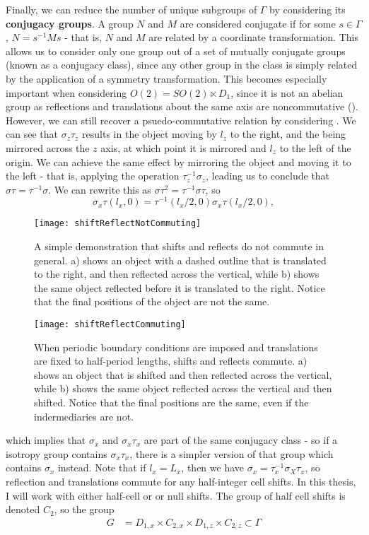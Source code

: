 Finally, we can reduce the number of unique subgroups of $\Gamma$ by considering its {\bf conjugacy groups}. A group $N$ and $M$ are considered conjugate if for some $s \in \Gamma$, $N = s^{-1}Ms$ - that is, $N$ and $M$ are related by a coordinate transformation. This allows us to consider only one group out of a set of mutually conjugate groups (known as a conjugacy class), since any other group in the class is simply related by the application of a symmetry transformation. This becomes especially important when considering $O(2) =  SO(2) \ltimes D_{1}$, since it is not an abelian group as reflections and translations about the same axis are noncommutative (). However, we can still recover a psuedo-commutative relation by considering . We can see that $\sigma_z\tau_z$ results in the object moving by $l_z$ to the right, and the being mirrored across the $z$ axis, at which point it is mirrored and $l_z$ to the left of the origin. We can achieve the same effect by mirroring the object and moving it to the left - that is, applying the operation $\tau_z^{-1}\sigma_z$, leading us to conclude that $\sigma\tau = \tau^{-1}\sigma$. We can rewrite this as $\sigma\tau^2 = \tau^{-1}\sigma\tau$, so
\begin{equation}
\sigma_x\tau(l_x,0) = \tau^{-1}(l_x/2,0)\sigma_x\tau(l_x/2,0),
\end{equation}

\begin{figure}[t!]
\texttt{[image: shiftReflectNotCommuting]}
\caption{A simple demonstration that shifts and reflects do not commute in general. a) shows an object with a dashed outline that is translated to the right, and then reflected across the vertical, while b) shows the same object reflected before it is translated to the right. Notice that the final positions of the object are not the same.}\label{fig:notabelian}
\end{figure}

\begin{figure}[t!]
\texttt{[image: shiftReflectCommuting]}
\caption{When periodic boundary conditions are imposed and translations are fixed to half-period lengths, shifts and reflects commute. a) shows an object that is shifted and then reflected across the vertical, while b) shows the same object reflected across the vertical and then shifted. Notice that the final positions are the same, even if the indermediaries are not.}\label{fig:abelian}
\end{figure}
which implies that $\sigma_x$ and $\sigma_x\tau_x$ are part of the same conjugacy class - so if a isotropy group contains $\sigma_x\tau_x$, there is a simpler version of that group which contains $\sigma_x$ instead. Note that if $l_x = L_x$, then we have $\sigma_x = \tau_x^{-1}\sigma_X\tau_x$, so reflection and translations commute for any half-integer cell shifts. In this thesis, I will work with either half-cell or or null shifts. The group of half cell shifts is denoted $C_2$, so the group 
\begin{align}
G &= D_{1,x} \times C_{2,x} \times D_{1,z} \times C_{2,z} \subset \Gamma
\end{align} 

